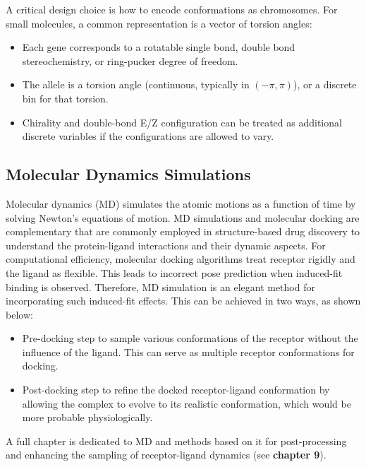 \documentclass[12pt]{article}
\begin{document}
A critical design choice is how to encode conformations as chromosomes. For small molecules, a common representation is a vector of torsion angles:

\begin{itemize}
\item Each gene corresponds to a rotatable single bond, double bond stereochemistry, or ring-pucker degree of freedom.
\item The allele is a torsion angle (continuous, typically in $(-\pi, \pi)$), or a discrete bin for that torsion.
\item Chirality and double-bond E/Z configuration can be treated as additional discrete variables if the configurations are allowed to vary.
\end{itemize}

\subsection{Molecular Dynamics Simulations}

Molecular dynamics (MD) simulates the atomic motions as a function of time by solving Newton’s equations of motion.  MD simulations and molecular docking are complementary\cite{CH2_guterres2020improving} that are commonly employed in structure-based drug discovery to understand the protein-ligand interactions and their dynamic aspects. For computational efficiency, molecular docking algorithms treat receptor rigidly and the ligand as flexible. This leads to incorrect pose prediction when induced-fit binding is observed\cite{CH2_salmaso2018bridging}. Therefore, MD simulation is an elegant method for incorporating such induced-fit effects. This can be achieved in two ways, as shown below:

\begin{itemize}
\item Pre-docking step to sample various conformations of the receptor without the influence of the ligand.  This can serve as multiple receptor conformations for docking.
\item Post-docking step to refine the docked receptor-ligand conformation by allowing the complex to evolve to its realistic conformation, which would be more probable physiologically.
\end{itemize}

A full chapter is dedicated to MD and methods based on it for post-processing and enhancing the sampling of receptor-ligand dynamics (see \textbf{chapter 9}).
\end{document}
